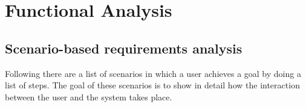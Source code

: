 
\chapter{Functional Analysis} %

\label{Chapter3} %


\section{Scenario-based requirements analysis}

Following there are a list of scenarios in which a user achieves a goal by doing a list of steps. The goal of these scenarios is to show in detail how the interaction between the user and the system takes place.

